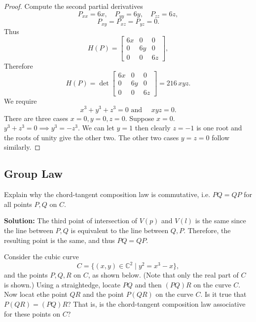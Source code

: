 \begin{proof}
    Compute the second partial derivatives
    \[
        P_{xx} = 6x, \quad P_{yy} = 6y, \quad P_{zz} = 6z,
    \]
    \[
        P_{xy} = P_{xz} = P_{yz} = 0.
    \]
    Thus
    \[
        H(P) =\begin{bmatrix}
            6x & 0 & 0 \\
            0 & 6y & 0 \\
            0 & 0 & 6z
        \end{bmatrix},
    \]
    Therefore
    \[
        H(P) = \det \begin{bmatrix}6x & 0 & 0 \\ 0 & 6y & 0 \\ 0 & 0 & 6z\end{bmatrix} = 216 \, xyz.
    \]
    We require
    \[
        x^3 + y^3 + z^3 = 0 \text{ and } \quad xyz = 0.
    \]
    There are three cases $x = 0, y = 0, z = 0$.
    Suppose $x = 0$.
    \(y^3 + z^3 = 0 \implies y^3 = -z^3.\)
    We can let $y = 1$ then clearly $z = -1$ is one root and the roots of unity give the other two.
    The other two cases $y = z = 0$ follow similarly.
\end{proof}

\subsection{Group Law}

\begin{tcolorbox}[title=Problem 1, breakable]
    Explain why the chord-tangent composition law is commutative, i.e.
    $PQ = QP$ for all points $P, Q$ on $C$.
\end{tcolorbox}

\textbf{Solution: } The third point of intersection of $V(p)$ and $V(l)$ is the same since the line between $P, Q$ 
is equivalent to the line between $Q, P$. Therefore, the resulting point is the same, and thus $PQ = QP$.

\begin{tcolorbox}[title=Problem 2, breakable]
    Consider the cubic curve  
    \[C = \{(x, y) \in \mathbb{C}^2 \mid y^2 = x^3 - x\},\]
    and the points $P, Q, R$ on $C$, as shown below. (Note that only the 
    real part of $C$ is shown.)
    Using a straightedge, locate $PQ$ and then $(PQ)R$ on the curve $C$.
    Now locat ethe point $QR$ and the point $P(QR)$ on the curve $C$.
    Is it true that $P(QR) = (PQ)R$? That is, is the chord-tangent composition
    law associative for these points on $C$?
\end{tcolorbox}

